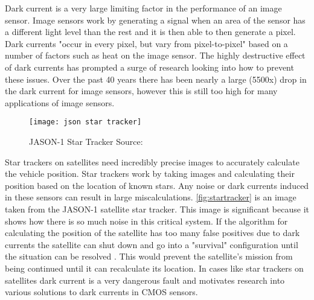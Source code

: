 \par Dark current is a very large limiting factor in the performance of an image sensor. Image sensors work by generating a signal when an area of the sensor has a different light level than the rest and it is then able to then generate a pixel. Dark currents "occur in every pixel, but vary from pixel-to-pixel" based on a number of factors such as heat on the image sensor. The highly destructive effect of dark currents has prompted a surge of research looking into how to prevent these issues. Over the past 40 years there has been nearly a large (5500x) drop in the dark current for image sensors, however this is still too high for many applications of image sensors\cite{mcgrath_tobin_goiffon_magan_2018}.
\begin{figure}[H]
    \texttt{[image: json star tracker]}
    \caption{JASON-1 Star Tracker Source:\cite{bardoux_penquer_gilard_ecoffet_auvergne_2017}}
    \label{fig:startracker}
\end{figure}
\par Star trackers on satellites need incredibly precise images to accurately calculate the vehicle position. Star trackers work by taking images and calculating their position based on the location of known stars. Any noise or dark currents induced in these sensors can result in large miscalculations. \autoref{fig:startracker} is an image taken from the JASON-1 satellite star tracker. This image is significant because it shows how there is so much noise in this critical system. If the algorithm for calculating the position of the satellite has too many false positives due to dark currents the satellite can shut down and go into a "survival" configuration until the situation can be resolved \cite{bardoux_penquer_gilard_ecoffet_auvergne_2017}. This would prevent the satellite's mission from being continued until it can recalculate its location. In cases like star trackers on satellites dark current is a very dangerous fault and motivates research into various solutions to dark currents in CMOS sensors.